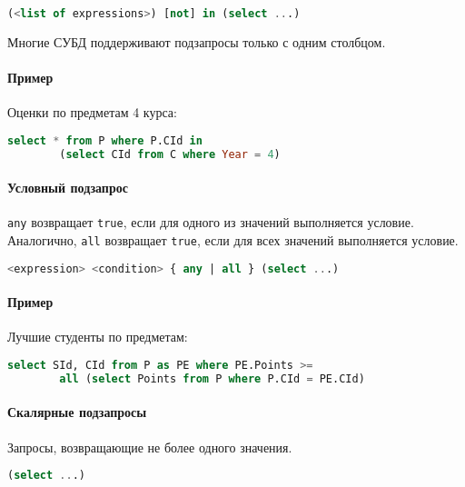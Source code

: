 \begin{lstlisting}[language=SQL]
    (<list of expressions>) [not] in (select ...)
\end{lstlisting}

\begin{remark}
	Многие СУБД поддерживают подзапросы только с одним столбцом.
\end{remark}

\paragraph{Пример}

Оценки по предметам 4 курса:

\begin{lstlisting}[language=SQL]
    select * from P where P.CId in
        (select CId from C where Year = 4)
\end{lstlisting}

\paragraph{Условный подзапрос}

\texttt{any} возвращает \texttt{true}, если для одного из значений выполняется
условие. Аналогично, \texttt{all} возвращает \texttt{true}, если для всех
значений выполняется условие.

\begin{lstlisting}[language=SQL]
    <expression> <condition> { any | all } (select ...)
\end{lstlisting}

\paragraph{Пример}

Лучшие студенты по предметам:

\begin{lstlisting}[language=SQL]
    select SId, CId from P as PE where PE.Points >=
        all (select Points from P where P.CId = PE.CId)
\end{lstlisting}

\paragraph{Скалярные подзапросы}

Запросы, возвращающие не более одного значения.

\begin{lstlisting}[language=SQL]
    (select ...)
\end{lstlisting}

